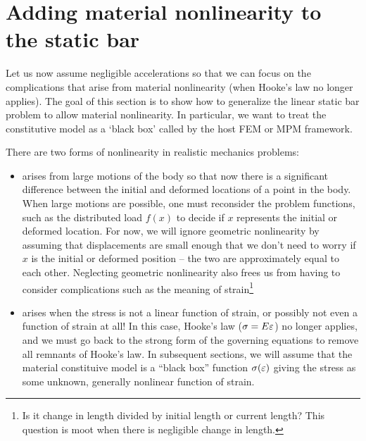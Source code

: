 
\section{Adding material nonlinearity to the \oneD static bar}
Let us now assume negligible accelerations so that we can focus on the complications that arise from material nonlinearity (\ie when Hooke's law no longer applies).
The goal of this section is to show how to generalize the linear static bar problem to allow material nonlinearity.  In particular, we want to treat the constitutive model as a `black box' called by the host FEM or MPM framework.


There are two forms of nonlinearity in realistic mechanics problems: 
\begin{itemize}
  \item {} arises from large motions of the body so that now there is a significant difference between the initial and deformed locations of a point in the body. When large motions are possible, one must reconsider the problem functions, such as the distributed load $f(x)$ to decide if $x$ represents the initial or deformed location. For now, we will ignore geometric nonlinearity by assuming that displacements are small enough that we don't need to worry if $x$ is the initial or deformed position -- the two are approximately equal to each other. Neglecting geometric nonlinearity also frees us from having to consider complications such as the meaning of strain\footnote{Is it change in length divided by initial length or current length? This question is moot when there is negligible change in length.}
  \item {} arises when the stress is not a linear function of strain, or possibly not even a function of strain at all! In this case, Hooke's law (${\sigma}=E{\varepsilon}$) no longer applies, and we must go back to the strong form of the governing equations to remove all remnants of Hooke's law. In subsequent sections, we will assume that the material constituive model is a ``black box'' function ${\sigma}({\varepsilon})$ giving the stress as some unknown, generally nonlinear function of strain.
\end{itemize}














